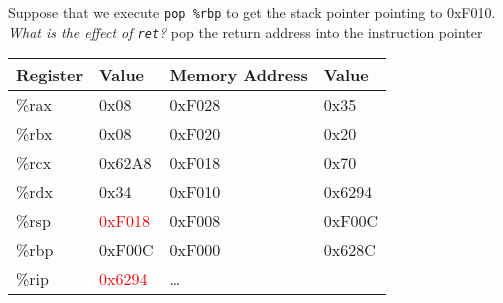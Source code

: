 \documentclass{article}
\begin{document}
Suppose that we execute \texttt{pop \%rbp} to get the stack pointer pointing to 0xF010. \\
\textit{What is the effect of \texttt{ret}?} pop the return address into the instruction pointer \\
\begin{tabular}{|l|l||l|l|} \hline
Register & Value & Memory Address & Value \\ \hline
\%rax & 0x08   & 0xF028 & 0x35   \\ \hline
\%rbx & 0x08   & 0xF020 & 0x20   \\ \hline
\%rcx & 0x62A8 & 0xF018 & 0x70   \\ \hline
\%rdx & 0x34   & 0xF010 & 0x6294 \\ \hline
\%rsp & \textcolor{red}{0xF018} & 0xF008 & 0xF00C \\ \hline
\%rbp & 0xF00C & 0xF000 & 0x628C   \\ \hline
\%rip & \textcolor{red}{0x6294} & \dots  &        \\ \hline
\end{tabular} \\
\end{document}
